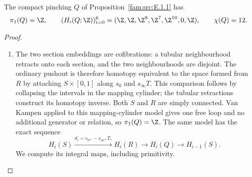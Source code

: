 \begin{proposition}\hypertarget{tag-01R4}{}\label{fam:src:E.1.4}\label{fam:st:E.1.4}

The compact pinching $Q$ of Proposition~\ref{fam:src:E.1.1} has
\[
 \pi_1(Q)=\Z,\qquad
 (H_i(Q;\Z))_{i=0}^6
   =(\Z,\Z,\Z^8,\Z^7,\Z^{10},0,\Z),\qquad\chi(Q)=12.
\]

\end{proposition}



\begin{proof}
\begin{enumerate}[label=\arabic*.,leftmargin=*]
\item The two section embeddings are cofibrations: a tubular neighbourhood
retracts onto each section, and the two neighbourhoods are disjoint.
The ordinary pushout is therefore homotopy equivalent to the space
formed from $R$ by attaching $S\times[0,1]$ along
$s_0$ and $s_\infty T$. This comparison follows by collapsing the
intervals in the mapping cylinder; the tubular retractions construct
its homotopy inverse. Both $S$ and $R$ are simply connected. Van
Kampen applied to this mapping-cylinder model gives one free loop
and no additional generator or relation, so $\pi_1(Q)=\Z$.
The same model has the exact sequence
\begin{equation}
 H_i(S)\xrightarrow{d_i=s_{0*}-s_{\infty*}T_*}H_i(R)
 \longrightarrow H_i(Q)\longrightarrow H_{i-1}(S).
\label{pub:I:eq:E4}
\end{equation}
We compute its integral maps, including primitivity.


\end{enumerate}
\end{proof}
